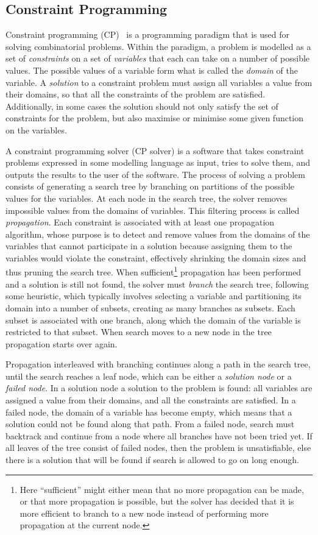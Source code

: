 \documentclass[a4paper,11pt]{article}
\numberwithin{equation}{section}
\begin{document}
\subsection{Constraint Programming}
\label{bg:cp}
Constraint programming (CP)~\cite{Apt:constraintsBook}
is a programming paradigm that is used for solving
combinatorial problems. Within the paradigm, a problem is
modelled as a set of \emph{constraints} on a
set of \emph{variables} that each can take on a number of
possible values. The possible values of 
a variable form what is called the \emph{domain} of the variable.
A \emph{solution} to a constraint problem must assign all variables
a value from their domains, so that all the constraints of the problem
are satisfied. Additionally, in some cases the solution should not only
satisfy the set of constraints for the
problem, but also maximise or minimise some given function on the variables.

A constraint programming solver (CP solver) is a software that
takes constraint problems expressed in some modelling language as input,
tries to solve them, and outputs the results to the user of the software.
The process of solving a problem consists of generating a search tree by branching
on partitions of the possible values for the variables. 
At each node in the search tree,
the solver removes impossible values from the domains of variables.
This filtering process is called \emph{propagation}. Each constraint is
associated with at least one propagation algorithm, whose purpose is to detect
and remove values from the domains of the variables
that cannot participate in a solution because assigning them to
the variables would violate the constraint,
effectively shrinking the domain sizes and thus 
pruning the search tree.
When sufficient\footnote{Here ``sufficient'' might either mean that no more
  propagation can be made, or that more propagation is possible,
  but the solver has decided that it is more efficient to branch to a new node instead of 
  performing more propagation at the current node.}
propagation has been performed and a solution is still not found,
the solver must \emph{branch} the search tree, following some heuristic,
which typically involves selecting a variable and partitioning its domain 
into a number of subsets, creating as many branches as subsets.
Each subset is associated with one branch, along which the domain
of the variable is restricted to that subset.
When search moves to a new node in the tree propagation starts over again.

Propagation interleaved with branching continues along a path in the search tree,
until the search reaches a leaf node, which can be either a
\emph{solution node} or a \emph{failed node}.
In a solution node a solution to the problem is found:
all variables are assigned a value
from their domains, and all the constraints are satisfied.
In a failed node, the domain of a variable has become empty, which
means that a solution could not be found along that path.
From a failed node, search must backtrack and continue from a node where all branches
have not been tried yet. If all leaves of the tree consist of failed nodes, then
the problem is unsatisfiable, else there is a solution that will be
found if search is allowed to go on long enough.
\end{document}

